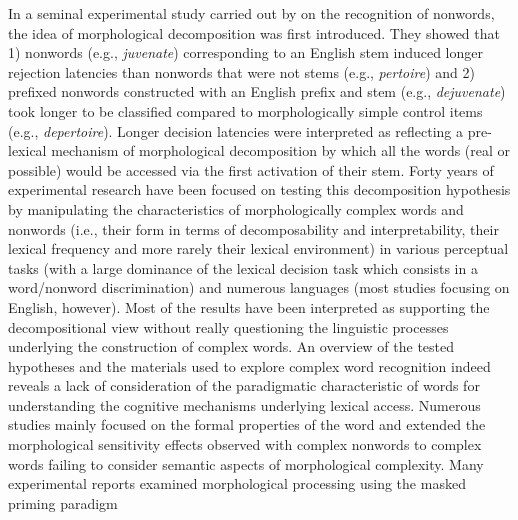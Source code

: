 \documentclass[output=paper]{langsci/langscibook}
\begin{document}

In a seminal experimental study carried out by %
\citet{TaftForster1975} %
%
on
the recognition of nonwords, the idea of morphological decomposition was
first introduced. They showed that 1) nonwords (e.g., \emph{juvenate})
corresponding to an English stem induced longer rejection latencies than
nonwords that were not stems (e.g., \emph{pertoire}) and 2) prefixed
nonwords constructed with an English prefix and stem (e.g.,
\emph{dejuvenate}) took longer to be classified compared to
morphologically simple control items (e.g., \emph{depertoire}). Longer
decision latencies were interpreted as reflecting a pre-lexical
mechanism of morphological decomposition by which all the words (real or
possible) would be accessed via the first activation of their stem.
Forty years of experimental research have been focused on testing this
decomposition hypothesis by manipulating the characteristics of
morphologically complex words and nonwords (i.e., their form in terms of
decomposability and interpretability, their lexical frequency and more
rarely their lexical environment) in various perceptual tasks (with
 a large dominance of the lexical decision task which
consists in a word/nonword discrimination) and numerous languages
(most  studies focusing on English, however). Most of the
results have been interpreted as supporting the decompositional view %
\citep[see the reviews of][]{AmentaCrepaldi2012,DiependaeleGraingerSandra2012} %
%
%
 without really questioning the linguistic processes
underlying the construction of complex words. An overview of the tested
hypotheses and the materials used to explore complex word recognition
indeed reveals  a lack of consideration of the paradigmatic
characteristic of words for understanding the cognitive mechanisms
underlying lexical access. Numerous studies mainly focused on the formal
properties of the word and extended the morphological sensitivity
effects observed with complex nonwords to complex words %
\citep[e.g.][]{TaftForster1976,CaramazzaLaudannaRomani1988,LaudannaCermeleEtAl1997,CrepaldiRastleDavis2010} %
 failing to consider
semantic aspects of morphological complexity. Many experimental reports
examined morphological processing using the masked priming paradigm %
\end{document}
